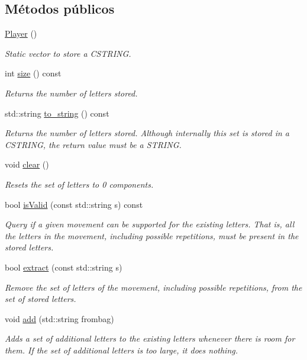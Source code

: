 \subsection*{Métodos públicos}
\begin{DoxyCompactItemize}
\item 
\hyperlink{classPlayer_affe0cc3cb714f6deb4e62f0c0d3f1fd8}{Player} ()
\begin{DoxyCompactList}\small\item\em Static vector to store a C\+S\+T\+R\+I\+NG. \end{DoxyCompactList}\item 
int \hyperlink{classPlayer_a706f8e7eb9f430881ce2c96e6f525b62}{size} () const
\begin{DoxyCompactList}\small\item\em Returns the number of letters stored. \end{DoxyCompactList}\item 
std\+::string \hyperlink{classPlayer_a07c689d9000618e4d596ef47140f94fd}{to\+\_\+string} () const
\begin{DoxyCompactList}\small\item\em Returns the number of letters stored. Although internally this set is stored in a C\+S\+T\+R\+I\+NG, the return value must be a S\+T\+R\+I\+NG. \end{DoxyCompactList}\item 
\mbox{\label{classPlayer_af1dda5581f5f56c61bac0cf07a300bdd}} 
void \hyperlink{classPlayer_af1dda5581f5f56c61bac0cf07a300bdd}{clear} ()
\begin{DoxyCompactList}\small\item\em Resets the set of letters to 0 components. \end{DoxyCompactList}\item 
bool \hyperlink{classPlayer_a77e7a96403c899054e633eb88c2997c5}{is\+Valid} (const std\+::string s) const
\begin{DoxyCompactList}\small\item\em Query if a given movement can be supported for the existing letters. That is, all the letters in the movement, including possible repetitions, must be present in the stored letters. \end{DoxyCompactList}\item 
bool \hyperlink{classPlayer_af5cf742e076aa1e467272d66cd3e96ee}{extract} (const std\+::string s)
\begin{DoxyCompactList}\small\item\em Remove the set of letters of the movement, including possible repetitions, from the set of stored letters. \end{DoxyCompactList}\item 
void \hyperlink{classPlayer_aeb62665ce6bda2e99c1b7b243b386211}{add} (std\+::string frombag)
\begin{DoxyCompactList}\small\item\em Adds a set of additional letters to the existing letters whenever there is room for them. If the set of additional letters is too large, it does nothing. \end{DoxyCompactList}\end{DoxyCompactItemize}


